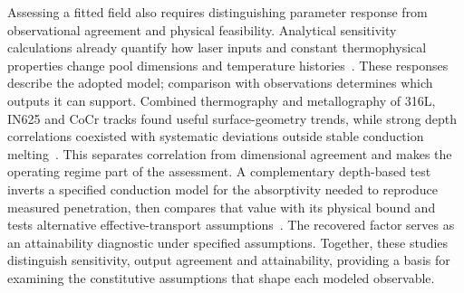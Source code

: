 Assessing a fitted field also requires distinguishing parameter response from observational agreement and physical feasibility. Analytical sensitivity calculations already quantify how laser inputs and constant thermophysical properties change pool dimensions and temperature histories~\cite{yang2024}. These responses describe the adopted model; comparison with observations determines which outputs it can support. Combined thermography and metallography of 316L, IN625 and CoCr tracks found useful surface-geometry trends, while strong depth correlations coexisted with systematic deviations outside stable conduction melting~\cite{soares2026}. This separates correlation from dimensional agreement and makes the operating regime part of the assessment. A complementary depth-based test inverts a specified conduction model for the absorptivity needed to reproduce measured penetration, then compares that value with its physical bound and tests alternative effective-transport assumptions~\cite{hong2026}. The recovered factor serves as an attainability diagnostic under specified assumptions. Together, these studies distinguish sensitivity, output agreement and attainability, providing a basis for examining the constitutive assumptions that shape each modeled observable.
